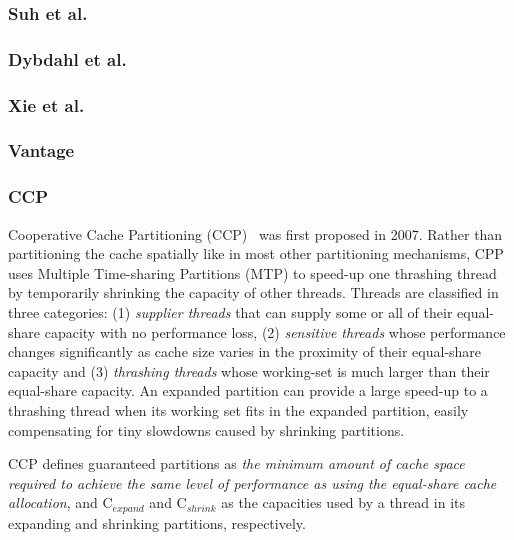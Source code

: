 \subsubsection{Suh et al.}


\subsubsection{Dybdahl et al.}


\subsubsection{Xie et al.}


\subsubsection{Vantage}


\subsubsection{CCP}

Cooperative Cache Partitioning (CCP)~\cite{cooperativeCachePartitioning} was first proposed in 2007. 
Rather than partitioning the cache spatially like in most other partitioning mechanisms, CPP uses Multiple Time-sharing Partitions (MTP) to speed-up one thrashing thread by temporarily shrinking the capacity of other threads. 
Threads are classified in three categories: (1) \textit{supplier threads} that can supply some or all of their equal-share capacity with no performance loss, (2) \textit{sensitive threads} whose performance changes significantly as cache size varies in the proximity of their equal-share capacity and (3) \textit{thrashing threads} whose working-set is much larger than their equal-share capacity.
An expanded partition can provide a large speed-up to a thrashing thread when its working set fits in the expanded partition, easily compensating for tiny slowdowns caused by shrinking partitions. 

CCP defines guaranteed partitions as \textit{the minimum amount of cache space required to achieve the same level of performance as using the equal-share cache allocation}, and C$_{expand}$ and C$_{shrink}$ as the capacities used by a thread in its expanding and shrinking partitions, respectively. 

